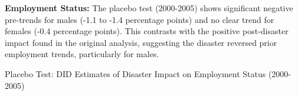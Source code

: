 \documentclass[serif, aspectratio=169]{beamer}
\newcommand{\returnbutton}[2]{%
  \vspace{-1.0cm}  %
  \hfill  %
  \hyperlink{#1}{%
    {\footnotesize\beamerbutton{#2}}%
  }%
  \vspace{0.3cm}  %
}
\begin{document}
\begin{frame}[label=employed_placebo]


\textbf{Employment Status:} The placebo test (2000-2005) shows significant negative pre-trends for males (-1.1 to -1.4 percentage points) and no clear trend for females (-0.4 percentage points). This contrasts with the positive post-disaster impact found in the original analysis, suggesting the disaster reversed prior employment trends, particularly for males.

\vspace{-1.5cm}
\returnbutton{employed}{Return}
\vspace{1.2cm}


\vspace{0.35cm}


\begin{table}[htbp]
\centering
\caption{Placebo Test: DID Estimates of Disaster Impact on Employment Status (2000-2005)}

\vspace{-0.2cm}


\end{table}
\end{frame}
\end{document}
